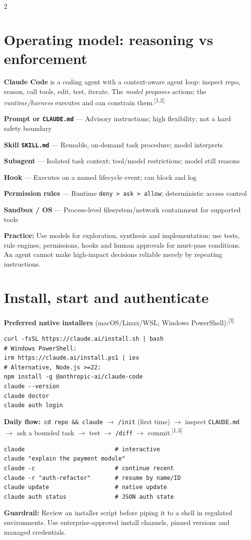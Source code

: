 \documentclass[9pt,a4paper]{extarticle}
\newcommand{\kw}[1]{\textbf{\color{navy}#1}}
\newcommand{\cmd}[1]{{\footnotesize\color{navy}\texttt{#1}}}
\newcommand{\src}[1]{\textsuperscript{\color{blue}[#1]}}
\newcommand{\tip}[1]{\par\textbf{\color{teal}Practice:} #1\par}
\newcommand{\warn}[1]{\par\textbf{\color{amber}Guardrail:} #1\par}
\newenvironment{tablist}{\begin{list}{}{\setlength{\leftmargin}{0pt}\setlength{\rightmargin}{0pt}\setlength{\itemindent}{0pt}\setlength{\itemsep}{1.4pt}\setlength{\parsep}{0pt}\setlength{\topsep}{2pt}}\fontsize{7.7}{9.3}\selectfont}{\end{list}}
\newcommand{\trow}[2]{\item \textbf{\color{navy}#1} \textcolor{slate}{---} #2}
\begin{document}
\vspace{7pt}\begin{multicols}{2}\raggedcolumns

\section{Operating model: reasoning vs enforcement}
\kw{Claude Code} is a coding agent with a context-aware agent loop: inspect repo, reason, call tools, edit, test, iterate. The \emph{model proposes} actions; the \emph{runtime/harness} executes and can constrain them.\src{1,2}
\begin{tablist}
\trow{Prompt or \cmd{CLAUDE.md}}{Advisory instructions; high flexibility; not a hard safety boundary}
\trow{Skill \cmd{SKILL.md}}{Reusable, on-demand task procedure; model interprets}
\trow{Subagent}{Isolated task context; tool/model restrictions; model still reasons}
\trow{Hook}{Executes on a named lifecycle event; can block and log}
\trow{Permission rules}{Runtime \cmd{deny > ask > allow}; deterministic access control}
\trow{Sandbox / OS}{Process-level filesystem/network containment for supported tools}
\end{tablist}
\tip{Use models for exploration, synthesis and implementation; use tests, rule engines, permissions, hooks and human approvals for must-pass conditions. An agent cannot make high-impact decisions reliable merely by repeating instructions.}

\section{Install, start and authenticate}
\kw{Preferred native installers} (macOS/Linux/WSL; Windows PowerShell):\src{3}
\begin{lstlisting}
curl -fsSL https://claude.ai/install.sh | bash
# Windows PowerShell:
irm https://claude.ai/install.ps1 | iex
# Alternative, Node.js >=22:
npm install -g @anthropic-ai/claude-code
claude --version
claude doctor
claude auth login
\end{lstlisting}
\kw{Daily flow:}\ \cmd{cd repo \&\& claude} $\to$ \cmd{/init} (first time) $\to$ inspect \cmd{CLAUDE.md} $\to$ ask a bounded task $\to$ test $\to$ \cmd{/diff} $\to$ commit.\src{1,3}
\begin{lstlisting}
claude                          # interactive
claude "explain the payment module"
claude -c                       # continue recent
claude -r "auth-refactor"       # resume by name/ID
claude update                   # native update
claude auth status              # JSON auth state
\end{lstlisting}
\warn{Review an installer script before piping it to a shell in regulated environments. Use enterprise-approved install channels, pinned versions and managed credentials.}


\end{multicols}
\end{document}
